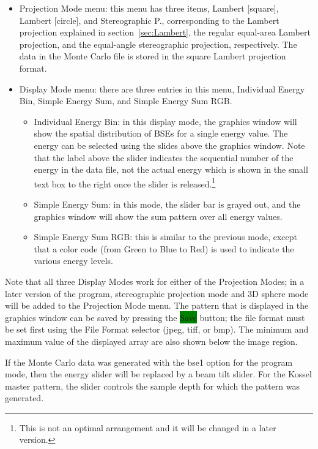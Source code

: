 \documentclass[DIV=calc, paper=letter, fontsize=11pt]{scrartcl}	 %
\newcommand{\button}[1]{\colorbox{green}{\textsf{#1}} button}
\begin{document}
\begin{itemize}
	\item \textsf{Projection Mode} menu:  this menu has three items, \textsf{Lambert [square]}, \textsf{Lambert [circle]}, and \textsf{Stereographic P.}, corresponding to the 
	Lambert projection explained in section~\ref{sec:Lambert}, the regular equal-area Lambert projection, and the equal-angle stereographic projection, respectively.  The data in the Monte Carlo
	file is stored in the square Lambert projection format.
	\item \textsf{Display Mode} menu: there are three entries in this menu, \textsf{Individual Energy Bin}, \textsf{Simple Energy Sum}, and \textsf{Simple Energy Sum RGB}.
	\begin{itemize}
		\item \textsf{Individual Energy Bin}: in this display mode, the graphics window will show the spatial distribution of BSEs for a single energy value.  The energy
		can be selected using the slides above the graphics window.  Note that the label above the slider indicates the sequential number of the energy in the 
		data file, not the actual energy which is shown in the small text box to the right once the slider is released.\footnote{This is not an optimal arrangement and 
		it will be changed in a later version.}
		\item \textsf{Simple Energy Sum}: in this mode, the slider bar is grayed out, and the graphics window will show the sum pattern over all energy values.  
		\item \textsf{Simple Energy Sum RGB}: this is similar to the previous mode, except that a color code (from Green to Blue to Red) 
		is used to indicate the various energy levels.
	\end{itemize}
\end{itemize}
Note that all three \textsf{Display Mode}s work for either of the \textsf{Projection Modes}; in a later version of the program, stereographic projection mode and 
3D sphere mode will be added to the \textsf{Projection Mode} menu.  The pattern that is displayed in the graphics window can be saved by pressing the 
\button{Save}; the file format must be set first using the File Format selector (jpeg, tiff, or bmp).  The minimum and maximum value of the displayed array
are also shown below the image region.

If the Monte Carlo data was generated with the \textsf{bse1} option for the program mode, then the energy slider will be replaced by a beam tilt slider.  For
the Kossel master pattern, the slider controls the sample depth for which the pattern was generated.
\end{document}

